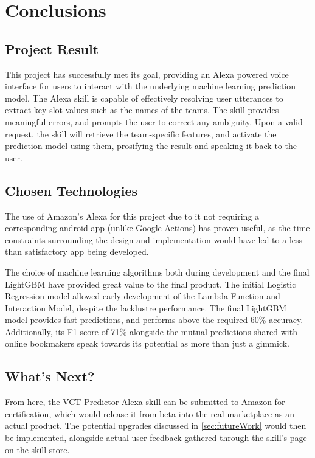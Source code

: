 \chapter{Conclusions}
\section{Project Result}
This project has successfully met its goal, providing an Alexa powered voice interface for users to interact with the underlying machine learning prediction model. The Alexa skill is capable of effectively resolving user utterances to extract key slot values such as the names of the teams. The skill provides meaningful errors, and prompts the user to correct any ambiguity. Upon a valid request, the skill will retrieve the team-specific features, and activate the prediction model using them, prosifying the result and speaking it back to the user.

\section{Chosen Technologies}
The use of Amazon's Alexa for this project due to it not requiring a corresponding android app (unlike Google Actions) has proven useful, as the time constraints surrounding the design and implementation would have led to a less than satisfactory app being developed.

The choice of machine learning algorithms both during development and the final LightGBM have provided great value to the final product. The initial Logistic Regression model allowed early development of the Lambda Function and Interaction Model, despite the lacklustre performance. The final LightGBM model provides fast predictions, and performs above the required 60\% accuracy. Additionally, its F1 score of 71\% alongside the mutual predictions shared with online bookmakers speak towards its potential as more than just a gimmick.

\section{What's Next?}
From here, the VCT Predictor Alexa skill can be submitted to Amazon for certification, which would release it from beta into the real marketplace as an actual product. The potential upgrades discussed in \autoref{sec:futureWork} would then be implemented, alongside actual user feedback gathered through the skill's page on the skill store.